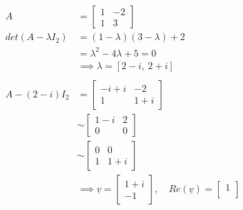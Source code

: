 \documentclass[11pt, a4paper, norsk]{article}
\begin{document}
        \begin{Example}{}{}
            \begin{align*}
                A &= \begin{bmatrix}
                    1 & -2 \\
                    1 & 3
                \end{bmatrix}
                \\
                    det(A - \lambda I_{2}) &= (1-\lambda)(3-\lambda) + 2
                    \\
                                           &= \lambda^2 - 4\lambda + 5 = 0
                                           \\
                                           &\implies \lambda = \left[ 2 - i, \  2 + i\right]
                                           \\
                                           \\
                    A - (2-i)I_2 &= \begin{bmatrix}
                        -i+i & -2 \\
                        1 & 1+i
                    \end{bmatrix}
                    \\
                                 &\sim \begin{bmatrix}
                                     1-i & 2 \\
                                     0 & 0
                                 \end{bmatrix}
                                 \\
                                 &\sim \begin{bmatrix}
                                     0 & 0 \\
                                     1 & 1+i
                                 \end{bmatrix}
                                 \\
                                 &\implies \underline{v} = \begin{bmatrix}
                                     1 + i \\
                                     -1
                                 \end{bmatrix}, \quad Re(\underline{v}) = \begin{bmatrix}
                                     1 \\

\end{bmatrix}
\end{align*}
\end{Example}
\end{document}
